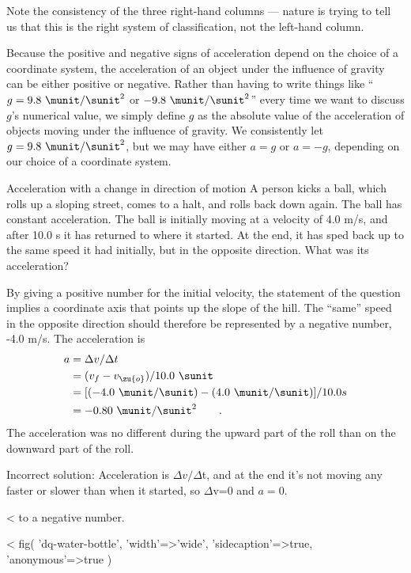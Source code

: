 \noindent Note the consistency of the three right-hand columns ---
nature is trying to tell us that this is the right system of
classification, not the left-hand column.

Because the positive and negative signs of acceleration
depend on the choice of a coordinate system, the acceleration
of an object under the influence of gravity can be either
positive or negative. Rather than having to write things
like ``$g=9.8\ \munit/\sunit^2$ or $-9.8\ \munit/\sunit^2$''
every time we want to
discuss $g$'s numerical value, we simply define $g$ as the
absolute value of the acceleration of objects moving under
the influence of gravity. We consistently let $g=9.8 \ \munit/\sunit^2$,
but we may have either $a=g$ or $a=-g$, depending on our
choice of a coordinate system.

\begin{eg}{Acceleration with a change in direction of motion}
\egquestion A person kicks a ball, which rolls up a sloping
street, comes to a halt, and rolls back down again. The ball
has constant acceleration. The ball is initially moving at a
velocity of 4.0 m/s, and after 10.0 s it has returned to
where it started. At the end, it has sped back up to the
same speed it had initially, but in the opposite direction.
What was its acceleration?

\eganswer By giving a positive number for the initial
velocity, the statement of the question implies a coordinate
axis that points up the slope of the hill. The ``same''
speed in the opposite direction should therefore be
represented by a negative number, -4.0 m/s. The acceleration
is
\begin{align*}
  a &= \Delta v/\Delta t \\
    &= (v_f-v_\zu{o})/10.0\ \sunit \\
    &= [(-4.0 \ \munit/\sunit)-(4.0 \ \munit/\sunit)]/10.0 s \\
    &= -0.80\ \munit/\sunit^2 \qquad .
\end{align*}
The
acceleration was no different during the upward part of the
roll than on the downward part of the roll.

Incorrect solution: Acceleration is $\Delta v/\Delta $t, and
at the end it's not moving any faster or slower than when it
started, so $\Delta $v=0 and $a=0$.

\noindent<%
to a negative number.
\end{eg}

<%
  fig(
    'dq-water-bottle',
    {
      'width'=>'wide',
      'sidecaption'=>true,
      'anonymous'=>true
    }
  )

